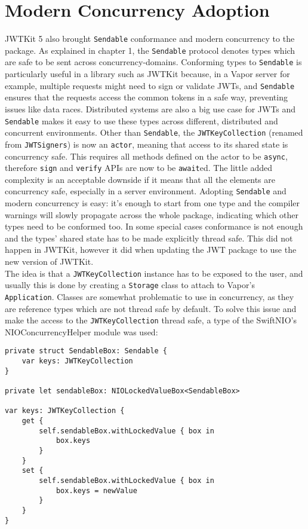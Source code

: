 \section{Modern Concurrency Adoption}
JWTKit 5 also brought \lstinline{Sendable} conformance and modern concurrency to the package. As explained in chapter 1, the \lstinline{Sendable} protocol denotes types which are safe to be sent across \gls{concurrency-domain}s. Conforming types to \lstinline{Sendable} is particularly useful in a library such as JWTKit because, in a Vapor server for example, multiple requests might need to sign or validate JWTs, and \lstinline{Sendable} ensures that the requests access the common tokens in a safe way, preventing issues like data races. Distributed systems are also a big use case for JWTs and \lstinline{Sendable} makes it easy to use these types across different, distributed and concurrent environments. Other than \lstinline{Sendable}, the \lstinline{JWTKeyCollection} (renamed from \lstinline{JWTSigners}) is now an \lstinline{actor}, meaning that access to its shared state is concurrency safe. This requires all methods defined on the actor to be \lstinline{async}, therefore \lstinline{sign} and \lstinline{verify} APIs are now to be \lstinline{await}ed. The little added complexity is  an acceptable downside if it means that all the elements are concurrency safe, especially in a server environment. Adopting \lstinline{Sendable} and modern concurrency is easy: it's enough to start from one type and the compiler warnings will slowly propagate across the whole package, indicating which other types need to be conformed too. In some special cases conformance is not enough and the types' shared state has to be made explicitly thread safe. This did not happen in JWTKit, however it did when updating the JWT package to use the new version of JWTKit. \\
The idea is that a \lstinline{JWTKeyCollection} instance has to be exposed to the user, and usually this is done by creating a \lstinline{Storage} class to attach to Vapor's \lstinline{Application}. Classes are somewhat problematic to use in concurrency, as they are reference types which are not thread safe by default.
To solve this issue and make the access to the \lstinline{JWTKeyCollection} thread safe, a type of the SwiftNIO's NIOConcurrencyHelper module was used: 
\begin{verbatim}
private struct SendableBox: Sendable {
    var keys: JWTKeyCollection
}
        
private let sendableBox: NIOLockedValueBox<SendableBox>
            
var keys: JWTKeyCollection {
    get {
        self.sendableBox.withLockedValue { box in
            box.keys
        }
    }
    set {
        self.sendableBox.withLockedValue { box in
            box.keys = newValue
        }
    }
}
\end{verbatim}
